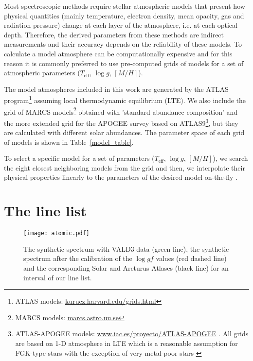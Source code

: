 \documentclass[fleqn,usenatbib]{mnras}
\begin{document}
Most spectroscopic methods require stellar atmospheric models that present how physical quantities (mainly temperature, electron density, mean opacity, gas and radiation pressure) 
change at each layer of the atmosphere, i.e. at each optical depth. Therefore, the derived parameters from these methods are indirect measurements and their accuracy depends on the 
reliability of these models. To calculate a model atmosphere can be computationally expensive and for this reason it is commonly preferred to use pre-computed grids of models 
for a set of atmospheric parameters ($T_{\mathrm{eff}}$, $\log g$, $[M/H]$). 

The model atmospheres included in this work are generated by the ATLAS program\footnote{ATLAS models: \url{kurucz.harvard.edu/grids.html}} \citep{kurucz} assuming 
local thermodynamic equilibrium (LTE). We also include the grid of MARCS models\footnote{MARCS models: \url{marcs.astro.uu.se}} \citep{Gustafsson2008} 
obtained with 'standard abundance composition' and the more extended grid for the APOGEE survey based on ATLAS9\footnote{ATLAS-APOGEE models: \url{www.iac.es/proyecto/ATLAS-APOGEE} 
\citep{meszaros2012}.
All grids are based on 1-D atmosphere in LTE which is a reasonable assumption for FGK-type stars with the exception of very metal-poor stars \citep[e.g.][]{ruchti2012}}, 
but they are calculated with different solar abundances. The parameter space of each grid of models is shown in Table~\ref{model_table}. 

To select a specific model for a set of parameters ($T_{\mathrm{eff}}$, $\log g$, $[M/H]$), we search the eight closest neighboring models from the grid and then, 
we interpolate their physical properties linearly to the parameters of the desired model on-the-fly \citep[the same function is used in][]{Andreasen2017}. 

\section{The line list}\label{linelist}

\begin{figure}
  \centering
   \texttt{[image: atomic.pdf]}
  \caption{The synthetic spectrum with VALD3 data (green line), the synthetic spectrum after the calibration of the $\log gf$ values (red dashed line) and the corresponding 
  Solar and Arcturus Atlases (black line) for an interval of our line list.}
  \label{calibration}
  \end{figure}
\end{document}

